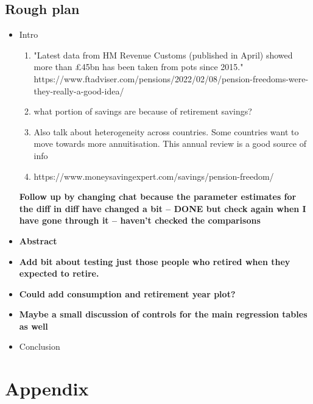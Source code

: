 \documentclass[12pt]{article}
\begin{document}
\subsection{Rough plan}
\begin{itemize}
    \item Intro
          \begin{enumerate}
              \item "Latest data from HM Revenue Customs (published in April)
                    showed more than £45bn has been taken from pots since 2015."
                    https://www.ftadviser.com/pensions/2022/02/08/pension-freedoms-were-they-really-a-good-idea/
              \item what portion of savings are because of retirement savings?
              \item Also talk about heterogeneity across countries. Some
                    countries want to move towards more annuitisation. This
                    annual review is a good source of info
                    \cite{banks_crawford_ar_2022}
              \item https://www.moneysavingexpert.com/savings/pension-freedom/
          \end{enumerate}

          \textbf{Follow up by changing chat because the parameter estimates for
              the diff in diff have changed a bit -- DONE but check again when I
              have gone through it -- haven't checked the comparisons }
    \item \textbf{Abstract}
    \item \textbf{Add bit about testing just those people who retired when they
              expected to retire.}
    \item \textbf{Could add consumption and retirement year plot?}
    \item \textbf{Maybe a small discussion of controls for the main regression
              tables as well}
    \item Conclusion
\end{itemize}

\section{Appendix}
\begin{landscape}
    
\end{landscape}



\end{document}
